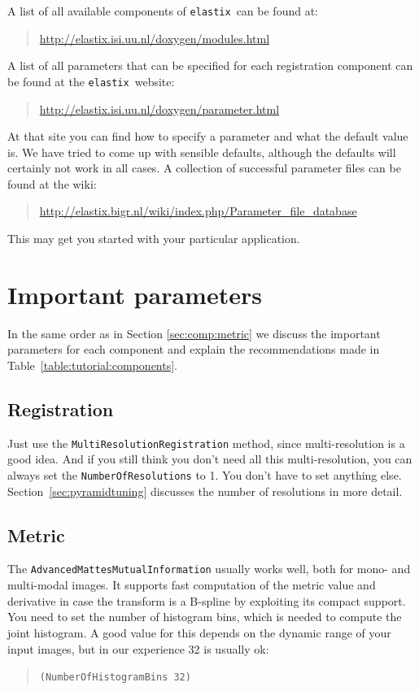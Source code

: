 \documentclass[]{report}
\newcommand{\elastix}{\texttt{elastix}}
\begin{document}
A list of all available components of \elastix\ can be found at:
\begin{quote}
\url{http://elastix.isi.uu.nl/doxygen/modules.html}
\end{quote}
A list of all parameters that can be specified for each registration
component can be found at the \elastix\ website:
\begin{quote}
\url{http://elastix.isi.uu.nl/doxygen/parameter.html}
\end{quote}
At that site you can find how to specify a parameter and what the
default value is. We have tried to come up with sensible defaults,
although the defaults will certainly not work in all cases. A
collection of successful parameter files can be found at the wiki:
\begin{quote}
\url{http://elastix.bigr.nl/wiki/index.php/Parameter_file_database}
\end{quote}
This may get you started with your particular application.

\section{Important parameters}\label{sec:Tutorial:importantparam}

In the same order as in Section \ref{sec:comp:metric} we discuss
the important parameters for each component and explain the
recommendations made in Table~\ref{table:tutorial:components}.

\subsection{Registration}\label{sec:registrationtuning}

Just use the \texttt{MultiResolutionRegistration} method, since
multi-resolution is a good idea. And if you still think you don't
need all this multi-resolution, you can always set the
\texttt{NumberOfResolutions} to 1. You don't have to set anything
else. Section~\ref{sec:pyramidtuning} discusses the number of
resolutions in more detail.

\subsection{Metric}

The \texttt{AdvancedMattesMutualInformation} usually works well,
both for mono- and multi-modal images. It supports fast computation
of the metric value and derivative in case the transform is a
B-spline by exploiting its compact support. You need to set the
number of histogram bins, which is needed to compute the joint
histogram. A good value for this depends on the dynamic range of
your input images, but in our experience 32 is usually ok:
\begin{quote}
\texttt{(NumberOfHistogramBins 32)}
\end{quote}
\end{document}
